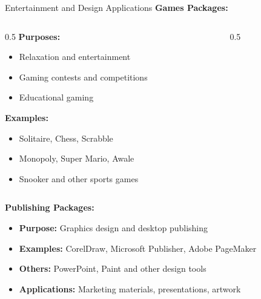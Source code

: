 \documentclass[aspectratio=169]{beamer}
\begin{document}
\begin{frame}{Entertainment and Design Applications}
    \textbf{Games Packages:}
    \begin{columns}
        \begin{column}{0.5\textwidth}
            \textbf{Purposes:}
            \begin{itemize}
                \item Relaxation and entertainment
                \item Gaming contests and competitions
                \item Educational gaming
            \end{itemize}
            
            \textbf{Examples:}
            \begin{itemize}
                \item Solitaire, Chess, Scrabble
                \item Monopoly, Super Mario, Awale
                \item Snooker and other sports games
            \end{itemize}
        \end{column}
        \begin{column}{0.5\textwidth}
        \end{column}
    \end{columns}
    
    \vspace{0.3cm}
    \textbf{Publishing Packages:}
    \begin{itemize}
        \item \textbf{Purpose:} Graphics design and desktop publishing
        \item \textbf{Examples:} CorelDraw, Microsoft Publisher, Adobe PageMaker
        \item \textbf{Others:} PowerPoint, Paint and other design tools
        \item \textbf{Applications:} Marketing materials, presentations, artwork
    \end{itemize}
\end{frame}
\end{document}
